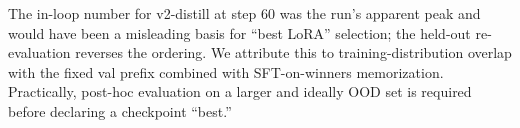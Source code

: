\documentclass[10pt]{article}
\begin{document}
The in-loop number for v2-distill at step 60 was the run's apparent peak
and would have been a misleading basis for ``best LoRA'' selection; the
held-out re-evaluation reverses the ordering. We attribute this to
training-distribution overlap with the fixed val prefix combined with
SFT-on-winners memorization. Practically, post-hoc evaluation on a
larger and ideally OOD set is required before declaring a checkpoint
``best.''
\end{document}
